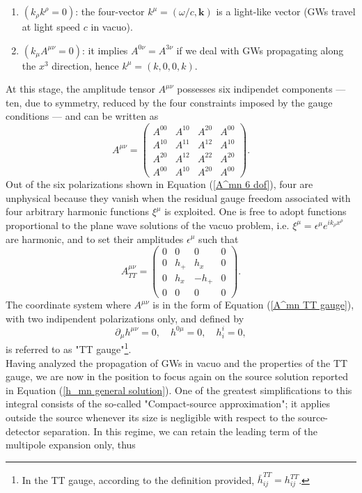 \begin{enumerate}
    \item $(k_\rho k^\rho=0)$: the four-vector $k^\mu=(\omega/c,\mathbf{k})$ is a light-like vector (GWs travel at light speed $c$ in vacuo).
    \item $(k_\mu A^{\mu\nu}=0)$: it implies $A^{0\nu}=A^{3\nu}$ if we deal with GWs propagating along the $x^3$ direction, hence $k^\mu=(k,0,0,k)$.
\end{enumerate}
At this stage, the amplitude tensor $A^{\mu\nu}$ possesses six indipendet components --- ten, due to symmetry, reduced by the four constraints imposed by the gauge conditions --- and can be written as
\begin{equation}\label{A^mn 6 dof}   
A^{\mu\nu} =
\begin{pmatrix}
A^{00} & A^{10} & A^{20} & A^{00} \\
A^{10} & A^{11} & A^{12} & A^{10} \\
A^{20} & A^{12} & A^{22} & A^{20} \\
A^{00} & A^{10} & A^{20} & A^{00}
\end{pmatrix}.
\end{equation}
Out of the six polarizations shown in Equation (\ref{A^mn 6 dof}), four are unphysical because they vanish when the residual gauge freedom associated with four arbitrary harmonic functions $\xi^\mu$ is exploited. One is free to adopt functions proportional to the plane wave solutions of the vacuo problem, i.e. $\xi^\mu=\epsilon^\mu e^{ik_\rho x^\rho}$ are harmonic, and to set their amplitudes $\epsilon^\mu$ such that 
\begin{equation}\label{A^mn TT gauge}   
A^{\mu\nu}_{TT} =
\begin{pmatrix}
0 & 0 & 0 & 0 \\
0 & h_+ & h_x & 0 \\
0 & h_x & -h_+ & 0 \\
0 & 0 & 0 & 0
\end{pmatrix}.
\end{equation}
The coordinate system where $A^{\mu\nu}$ is in the form of Equation (\ref{A^mn TT gauge}), with two indipendent polarizations only, and defined by 
\begin{equation}
    \partial_\mu h^{\mu\nu}=0, \quad h^{0\mu}=0, \quad h^i_i=0,
\end{equation}
is referred to as "TT gauge"\footnote{In the TT gauge, according to the definition provided, $\bar{h}_{ij}^{TT}=h_{ij}^{TT}$.}.\\Having analyzed the propagation of GWs in vacuo and the properties of the TT gauge, we are now in the position to focus again on the source solution reported in Equation (\ref{h_mn general solution}). One of the greatest simplifications to this integral consists of the so-called "Compact-source approximation"; it applies outside the source whenever its size is negligible with respect to the source-detector separation. In this regime, we can retain the leading term of the multipole expansion only, thus
